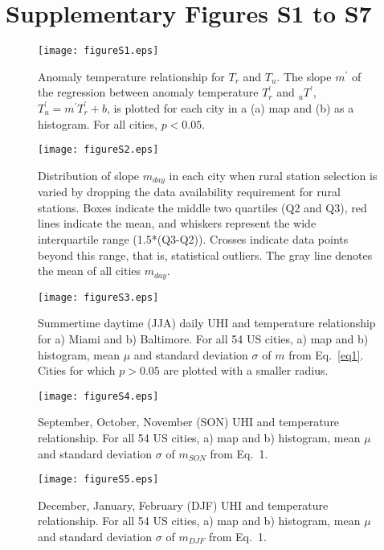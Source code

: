\section*{Supplementary Figures S1 to S7} 


\begin{figure}
\texttt{[image: figureS1.eps]}
\caption{Anomaly temperature relationship for $T_r$ and $T_u$. The slope $m^\prime$ of the regression between anomaly temperature $T^\prime _{r}$ and $ _uT^\prime$, $ T_u ^\prime = m^\prime T^\prime_{r} +b$, is plotted for each city in a (a) map and (b) as a histogram. For all cities, $p <0.05$.}
\end{figure}

\begin{figure}
\texttt{[image: figureS2.eps]}
\caption{Distribution of slope $m_{day}$ in each city when rural station selection is varied by dropping the data availability requirement for rural stations. Boxes indicate the middle two quartiles (Q2 and Q3), red lines indicate the mean, and whiskers represent the wide interquartile range (1.5*(Q3-Q2)). Crosses indicate data points beyond this range, that is, statistical outliers. The gray line denotes the mean of all cities $m_{day}$. }
\end{figure}

\begin{figure}
\texttt{[image: figureS3.eps]}
\caption{
Summertime daytime (JJA) daily UHI and temperature relationship for a) Miami and b) Baltimore. For all 54 US cities, a) map and b) histogram, mean $\mu$ and standard deviation $\sigma$ of $m$ from Eq.~\ref{eq1}.
Cities for which  $p >0.05$ are plotted with a smaller radius. }
\end{figure}

\begin{figure}
\texttt{[image: figureS4.eps]}
\caption{September, October, November (SON) UHI and temperature relationship. 
For all 54 US cities, a) map and b) histogram, mean $\mu$ and standard deviation $\sigma$ of $m_{SON}$ from Eq.~1.}
\end{figure}

\begin{figure}
\texttt{[image: figureS5.eps]}
\caption{December, January, February (DJF) UHI and temperature relationship. 
For all 54 US cities, a) map and b) histogram, mean $\mu$ and standard deviation $\sigma$ of $m_{DJF}$ from Eq.~1.}
\end{figure}

